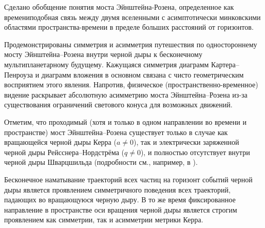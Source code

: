 
Сделано обобщение понятия моста Эйнштейна-Розена, определенное как времениподобная связь между двумя вселенными с асимптотически минковскими областями пространства-времени в пределе больших расстояний от горизонтов.

Продемонстрированы симметрия и асимметрия путешествия по одностороннему мосту Эйнштейна–Розена внутри черной дыры к бесконечному мультипланетарному будущему. Кажущаяся симметрия диаграмм Картера–Пенроуза и диаграмм вложения в основном связана с чисто геометрическим восприятием этого явления. Напротив, физическое (пространственно-временное) видение раскрывает абсолютную асимметрию моста Эйнштейна–Розена из-за существования ограничений светового конуса для возможных движений.

Отметим, что проходимый (хотя и только в одном направлении во времени и пространстве) мост Эйнштейна–Розена существует только в случае как вращающейся черной дыры Керра (\(a\neq0\)), так и электрически заряженной черной дыры Рейсснера–Нордстрёма (\(q\neq0\)), и полностью отсутствует внутри черной дыры Шварцшильда (подробности см., например, в \cite{thorne2000gravitation}).

Бесконечное наматывание траекторий всех частиц на горизонт событий черной дыры является проявлением симметричного поведения всех траекторий, падающих во вращающуюся черную дыру. В то же время фиксированное направление в пространстве оси вращения черной дыры является строгим проявлением как симметрии, так и асимметрии метрики Керра.

%
%	
%

